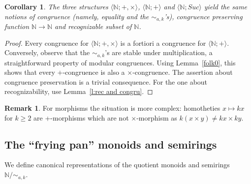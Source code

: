 \documentclass[11pt,a4paper]{article}
\newtheorem{corollary}[theorem]{Corollary}
\theoremstyle{definition} %
\newtheorem{remark}[theorem]{Remark}
\newcommand\+[1]{\mathcal{#1}} %
\newcommand{\N}{{\mathbb N}}     %
\newcommand{\Z}{{\mathbb Z}}     %
\newcommand{\Suc}{\textit{Suc}}
\newcommand{\seg}{\color{blue}}
\newcommand{\sege}{\color{cyan}}
\begin{document}
\begin{corollary}\label{+CPimpliesXCPN} 
The three structures 
$\langle \N;+,\times\rangle$, $\langle \N;+\rangle$ and $\langle \N;\Suc\rangle$
yield the same notions of congruence (namely, equality and the $\sim_{a,k}$'s),
congruence preserving function $\N\to \N$ and recognizable subset of $\N$.
\end{corollary}

\begin{proof}
 Every congruence for $\langle \N;+,\times\rangle$ is a fortiori
a congruence for $\langle \N;+\rangle$.
Conversely, observe that the $\sim_{a,k}$'s are stable under multiplication, 
a straightforward property of modular congruences. 
Using Lemma~\ref{folk0}, this shows that every $+$-congruence is also a $\times$-congruence. 
The assertion about congruence preservation is a trivial consequence.
For the one about recognizability, use Lemma~\ref{l:rec and congru}.
\end{proof}

%
\begin{remark}\label{r:morphimes+x} For morphisms  the situation is more complex:
homotheties $x\mapsto kx$ for $k\geq 2$ are +-morphisms which are not $\times$-morphism
as $k(x\times y)\neq kx\times ky$.
\end{remark}
\subsection{The ``frying pan''  monoids and semirings}\label{ss FryingPan}
We define canonical representations of the quotient monoids and semirings
$\N/\!\!\sim_{a,k}$.
\end{document}
